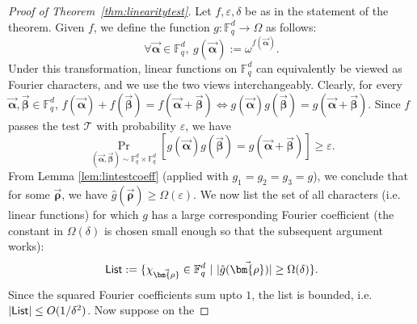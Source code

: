 \documentclass[11pt]{article}
\newcommand{\F}{\mathbb{F}}
\renewcommand{\ge}{ \geqslant}
\renewcommand{\epsilon}{\varepsilon}
\newcommand{\alphab}{\vec{\bm{\alpha}}}
\newcommand{\betab}{\vec{\bm{\beta}}}
\newcommand{\rhob}{\vec{\bm{\rho}}}
\begin{document}
\begin{proof}[Proof of Theorem~\ref{thm:linearitytest}] Let $f, \epsilon, \delta$ be as in the statement of the theorem. 
Given $f$, we define the function $g:\F_q^d\to\Omega$ as follows:
$$
\forall \alphab\in\F_q^d,\ g(\alphab):=\omega^{f(\alphab)}.$$
Under this transformation, linear functions on $\F_q^d$ can equivalently be viewed as Fourier characters, and we use the two views interchangeably. 
Clearly, for every $\alphab,\betab\in\F_q^d$, 
$
f(\alphab)+f(\betab)=f(\alphab+\betab)\Longleftrightarrow g(\alphab)g(\betab)=g(\alphab+\betab)
$. Since $f$ passes the test ${\mathcal T}$ with probability $\epsilon$, we have
  $$ \Pr_{(\alphab,\betab)\sim \F_q^d\times \F_q^d}[g(\alphab)g(\betab)=g(\alphab+\betab)] \geq \epsilon. $$ 
From Lemma \ref{lem:lintestcoeff} (applied with $g_1=g_2=g_3=g$), we conclude that for some $\rhob$, we have $\hat{g}(\rhob) \geq \Omega(\epsilon)$.
%
%
%
%
%
%
%
We now list the set of all characters (i.e. linear functions) for which $g$ has a large corresponding Fourier coefficient (the constant 
in $\Omega(\delta)$ is chosen small enough so that the subsequent argument works):  
$$ {\sf List} := \{\chi_{\rhob} \in \F_q^d  ~| ~ |\hat{g}(\rhob)| \geq \Omega(\delta)  \}.  
$$
Since the squared Fourier coefficients sum upto $1$, the list is bounded, i.e. $|{\sf List}| \leq O(1/\delta^2)$. Now suppose on the 

\end{proof}
\end{document}
